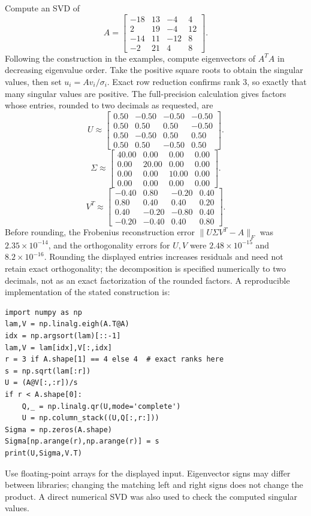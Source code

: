 \goal Compute an SVD of
\[A=\begin{bmatrix}-18&13&-4&4\\2&19&-4&12\\-14&11&-12&8\\-2&21&4&8\end{bmatrix}.\]
Following the construction in the examples, compute eigenvectors of $A^TA$ in decreasing eigenvalue order. Take the positive square roots to obtain the singular values, then set $u_i=Av_i/\sigma_i$. Exact row reduction confirms rank $3$, so exactly that many singular values are positive. The full-precision calculation gives factors whose entries, rounded to two decimals as requested, are
\[U\approx\begin{bmatrix}0.50&-0.50&-0.50&-0.50\\0.50&0.50&0.50&-0.50\\0.50&-0.50&0.50&0.50\\0.50&0.50&-0.50&0.50\end{bmatrix}.\]
\[\Sigma\approx\begin{bmatrix}40.00&0.00&0.00&0.00\\0.00&20.00&0.00&0.00\\0.00&0.00&10.00&0.00\\0.00&0.00&0.00&0.00\end{bmatrix}.\]
\[V^T\approx\begin{bmatrix}-0.40&0.80&-0.20&0.40\\0.80&0.40&0.40&0.20\\0.40&-0.20&-0.80&0.40\\-0.20&-0.40&0.40&0.80\end{bmatrix}.\]
Before rounding, the Frobenius reconstruction error $\|U\Sigma V^T-A\|_F$ was $2.35\times10^{-14}$, and the orthogonality errors for $U,V$ were $2.48\times10^{-15}$ and $8.2\times10^{-16}$. Rounding the displayed entries increases residuals and need not retain exact orthogonality; the decomposition is specified numerically to two decimals, not as an exact factorization of the rounded factors.
A reproducible implementation of the stated construction is:
\begin{verbatim}
import numpy as np
lam,V = np.linalg.eigh(A.T@A)
idx = np.argsort(lam)[::-1]
lam,V = lam[idx],V[:,idx]
r = 3 if A.shape[1] == 4 else 4  # exact ranks here
s = np.sqrt(lam[:r])
U = (A@V[:,:r])/s
if r < A.shape[0]:
    Q,_ = np.linalg.qr(U,mode='complete')
    U = np.column_stack((U,Q[:,r:]))
Sigma = np.zeros(A.shape)
Sigma[np.arange(r),np.arange(r)] = s
print(U,Sigma,V.T)
\end{verbatim}
Use floating-point arrays for the displayed input. Eigenvector signs may differ between libraries; changing the matching left and right signs does not change the product. A direct numerical SVD was also used to check the computed singular values.


